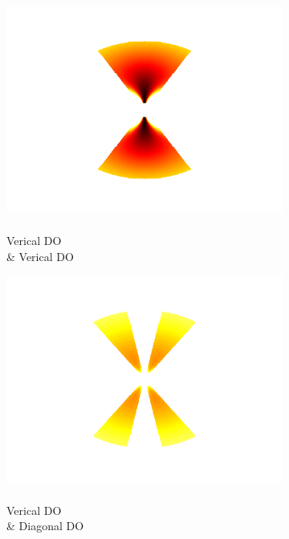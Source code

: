\documentclass[journal,onecolumn]{IEEEtran}
\begin{document}
\begin{figure}[h] \label{fig:bowtie-excite-maps}
    \centering
    \begin{subfigure}[b]{0.2\textwidth}
            \centering
            \captionsetup{justification=centering}
            \includegraphics[width=.85\linewidth]{j_1_1}
            \caption{\\ Verical DO \\ \& Verical DO}
    \end{subfigure}%
    \begin{subfigure}[b]{0.2\textwidth}
            \centering
            \captionsetup{justification=centering}
            \includegraphics[width=.85\linewidth]{j_1_2}
            \caption{\\ Verical DO \\ \& Diagonal DO}
    \end{subfigure}%
    \begin{subfigure}[b]{0.2\textwidth}

\end{subfigure}
\end{figure}
\end{document}
